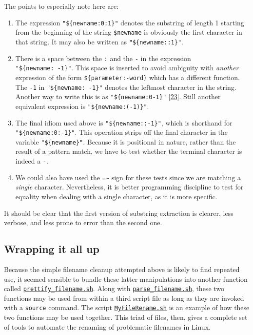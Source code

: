 \documentclass[
  a4paper,
]{article}
\begin{document}
The points to especially note here are:

\begin{enumerate}
\def\labelenumi{(\alph{enumi})}
\item
  The expression \texttt{"\$\{newname:0:1\}"} denotes the substring of
  length 1 starting from the beginning of the string \texttt{\$newname}
  is obviously the first character in that string. It may also be
  written as \texttt{"\$\{newname::1\}"}.
\item
  There is a space between the \texttt{:} and the \texttt{-} in the
  expression \texttt{"\$\{newname:\ -1\}"}. This space is inserted to
  avoid ambiguity with \emph{another} expression of the form
  \texttt{\$\{parameter:-word\}} which has a different function. The
  \texttt{-1} in \texttt{"\$\{newname:\ -1\}"} denotes the leftmost
  character in the string. Another way to write this is as
  \texttt{"\$\{newname:0-1\}"}
  {[}\protect\hyperlink{ref-lastchar}{23}{]}. Still another equivalent
  expression is \texttt{"\$\{newname:(-1)\}"}.
\item
  The final idiom used above is \texttt{"\$\{newname::-1\}"}, which is
  shorthand for \texttt{"\$\{newname:0:-1\}"}. This operation strips off
  the final character in the variable \texttt{"\$\{newname\}"}. Because
  it is positional in nature, rather than the result of a pattern match,
  we have to test whether the terminal character is indeed a \texttt{-}.
\item
  We could also have used the \texttt{=\textasciitilde{}} sign for these
  tests since we are matching a \emph{single} character. Nevertheless,
  it is better programming discipline to test for equality when dealing
  with a single character, as it is more specific.
\end{enumerate}

It should be clear that the first version of substring extraction is
clearer, less verbose, and less prone to error than the second one.

\hypertarget{wrapping-it-all-up}{%
\subsection{Wrapping it all up}\label{wrapping-it-all-up}}

Because the simple filename cleanup attempted above is likely to find
repeated use, it seemed sensible to bundle these latter manipulations
into another function called
\href{scripts/prettify_filename.sh}{\texttt{prettify\_filename.sh}}.
Along with
\href{scripts/parse_filename.sh}{\texttt{parse\_filename.sh}}, these two
functions may be used from within a third script file as long as they
are invoked with a \texttt{source} command. The script
\href{scripts/MyFileRename.sh}{\texttt{MyFileRename.sh}} is an example
of how these two functions may be used together. This triad of files,
then, gives a complete set of tools to automate the renaming of
problematic filenames in Linux.
\end{document}
